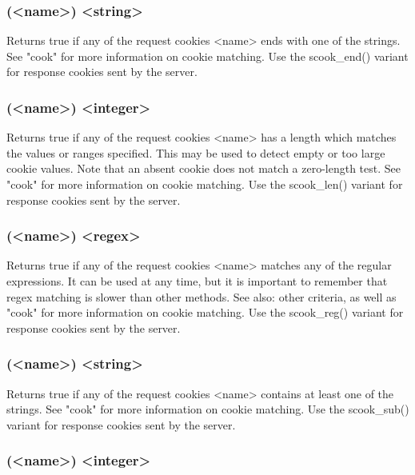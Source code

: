 \subsubsection[cook\_end]{(<name>) <string>}

  Returns true if any of the request cookies <name> ends with one of the
  strings. See "cook" for more information on cookie matching. Use the
  scook\_end() variant for response cookies sent by the server.

\subsubsection[cook\_len]{(<name>) <integer>}

  Returns true if any of the request cookies <name> has a length which matches
  the values or ranges specified. This may be used to detect empty or too large
  cookie values. Note that an absent cookie does not match a zero-length test.
  See "cook" for more information on cookie matching. Use the scook\_len()
  variant for response cookies sent by the server.

\subsubsection[cook\_reg]{(<name>) <regex>}

  Returns true if any of the request cookies <name> matches any of the regular
  expressions. It can be used at any time, but it is important to remember that
  regex matching is slower than other methods.
See also: other  criteria,
  as well as "cook" for more information on cookie matching. Use the
  scook\_reg() variant for response cookies sent by the server.

\subsubsection[cook\_sub]{(<name>) <string>}

  Returns true if any of the request cookies <name> contains at least one of
  the strings. See "cook" for more information on cookie matching. Use the
  scook\_sub() variant for response cookies sent by the server.

\subsubsection[cook\_val]{(<name>) <integer>}

